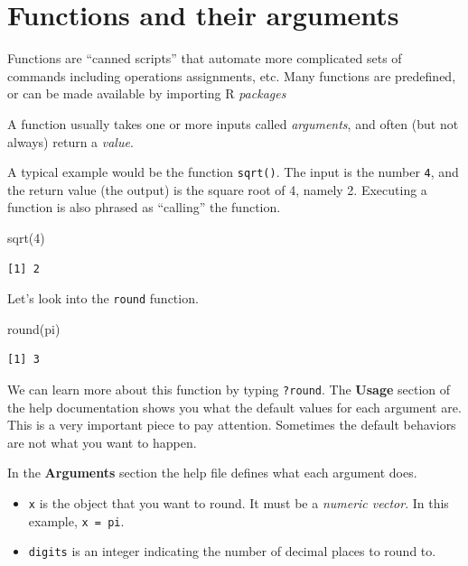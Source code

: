 \documentclass[
  letterpaper,
  DIV=11,
  numbers=noendperiod,
  oneside]{scrreprt}
\newenvironment{Shaded}{\begin{snugshade}}{\end{snugshade}}
\newcommand{\DecValTok}[1]{\textcolor[rgb]{0.68,0.00,0.00}{#1}}
\newcommand{\FunctionTok}[1]{\textcolor[rgb]{0.28,0.35,0.67}{#1}}
\newcommand{\NormalTok}[1]{\textcolor[rgb]{0.00,0.23,0.31}{#1}}
\providecommand{\tightlist}{%
  \setlength{\itemsep}{0pt}\setlength{\parskip}{0pt}}\usepackage{longtable,booktabs,array}
\begin{document}
\section{Functions and their
arguments}\label{functions-and-their-arguments}

Functions are ``canned scripts'' that automate more complicated sets of
commands including operations assignments, etc. Many functions are
predefined, or can be made available by importing R \emph{packages}

A function usually takes one or more inputs called \emph{arguments}, and
often (but not always) return a \emph{value}.

A typical example would be the function \texttt{sqrt()}. The input is
the number \texttt{4}, and the return value (the output) is the square
root of 4, namely 2. Executing a function is also phrased as ``calling''
the function.

\begin{Shaded}
\begin{Highlighting}[]
\FunctionTok{sqrt}\NormalTok{(}\DecValTok{4}\NormalTok{)}
\end{Highlighting}
\end{Shaded}

\begin{verbatim}
[1] 2
\end{verbatim}

Let's look into the \texttt{round} function.

\begin{Shaded}
\begin{Highlighting}[]
\FunctionTok{round}\NormalTok{(pi)}
\end{Highlighting}
\end{Shaded}

\begin{verbatim}
[1] 3
\end{verbatim}

We can learn more about this function by typing \texttt{?round}. The
\textbf{Usage} section of the help documentation shows you what the
default values for each argument are. This is a very important piece to
pay attention. Sometimes the default behaviors are not what you want to
happen.

In the \textbf{Arguments} section the help file defines what each
argument does.

\begin{itemize}
\tightlist
\item
  \texttt{x} is the object that you want to round. It must be a
  \emph{numeric vector}. In this example, \texttt{x\ =\ pi}.
\item
  \texttt{digits} is an integer indicating the number of decimal places
  to round to.
\end{itemize}
\end{document}
